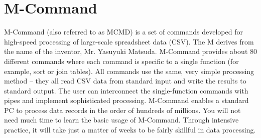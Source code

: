 
%

\section{M-Command\label{sect:whatis}}
M-Command (also referred to as MCMD) is a set of commands developed for high-speed processing of large-scale spreadsheet data (CSV). The M derives from the name of the inventor, Mr. Yasuyuki Matsuda. M-Command provides about 80 different commands where each command is specific to a single function (for example, sort or join tables). All commands use the same, very simple processing method – they all read CSV data from standard input and write the results to standard output. The user can interconnect the single-function commands with pipes and implement sophisticated processing. M-Command enables a standard PC to process data records in the order of hundreds of millions. You will not need much time to learn the basic usage of M-Command. Through intensive practice, it will take just a matter of weeks to be fairly skillful in data processing.





